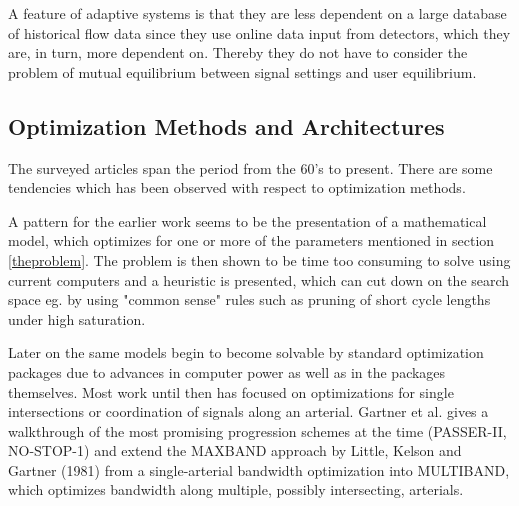 A feature of adaptive systems is that they are less dependent on a large database of historical flow data since they use online data input from detectors, which they are, in turn, more dependent on. Thereby they do not have to consider the problem of mutual equilibrium between signal settings and user equilibrium.

\subsection{Optimization Methods and Architectures}
The surveyed articles span the period from the 60's to present. There are some tendencies which has been observed with respect to optimization methods.

A pattern for the earlier work seems to be the presentation of a mathematical model, which optimizes for one or more of the parameters mentioned in section \ref{theproblem}. The problem is then shown to be time too consuming to solve using current computers and a heuristic is presented, which can cut down on the search space eg. by using "common sense" rules such as pruning of short cycle lengths under high saturation.

Later on the same models begin to become solvable by standard optimization packages due to advances in computer power as well as in the packages themselves. Most work until then has focused on optimizations for single intersections or coordination of signals along an arterial. Gartner et al. \cite{9} gives a walkthrough of the most promising progression schemes at the time (PASSER-II, NO-STOP-1) and extend the MAXBAND approach by Little, Kelson and Gartner (1981) from a single-arterial bandwidth optimization into MULTIBAND, which optimizes bandwidth along multiple, possibly intersecting, arterials. 

